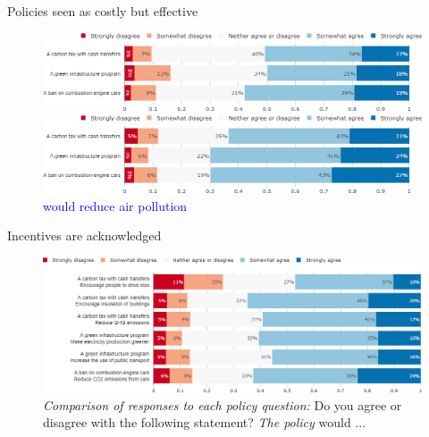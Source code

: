 \begin{framefont}{\small}
\begin{frame}{Policies seen as costly but effective}%

\begin{figure}[h!]
\vspace{-.1cm}
\centering
\caption{\textit{Comparison of responses to each policy question:} Do you agree or disagree with the following statement? \textit{The policy} would be \textcolor{blue}{costly to fight climate change}}
\includegraphics[width=.87\paperwidth]{../figures/FR/policies_cost_effective_FR.png}
\caption{ \textcolor{blue}{would reduce air pollution}}
\includegraphics[width=.87\paperwidth]{../figures/FR/policies_less_pollution_FR.png}
\end{figure}
\end{frame}

\begin{frame}{Incentives are acknowledged}
\begin{figure}[h!]
\vspace{-.1cm}
\centering
\caption{\textit{Comparison of responses to each policy question:} Do you agree or disagree with the following statement? \textit{The policy} would ...}
\includegraphics[width=.87\paperwidth]{../figures/FR/policies_effects_FR.png}
\end{figure}
\end{frame}



\end{framefont}

